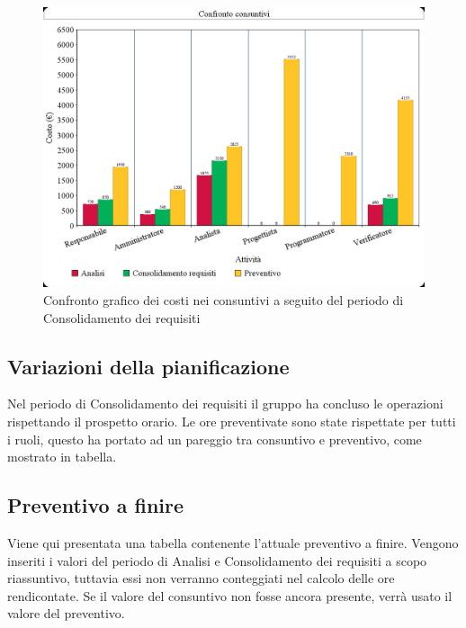 \documentclass[./PianodiProgetto.tex]{subfiles}
\begin{document}
\begin{figure}[H]
	\centering
	\includegraphics[width=1\linewidth]{img/grafici/CostiConsuntivi/consuntivo-costo-consolidamento_requisiti}
	\caption{Confronto grafico dei costi nei consuntivi a seguito del periodo di Consolidamento dei requisiti}
	\label{fig:consuntivo-costi-consolidamento_requisiti}
\end{figure}
\subsection{Variazioni della pianificazione}
Nel periodo di Consolidamento dei requisiti il gruppo ha concluso le operazioni rispettando il prospetto orario. Le ore preventivate sono state rispettate per tutti i ruoli, questo ha portato ad un pareggio tra consuntivo e preventivo, come mostrato in tabella.

\subsection{Preventivo a finire}
Viene qui presentata una tabella contenente l'attuale preventivo a finire.
Vengono inseriti i valori del periodo di Analisi e Consolidamento dei requisiti a scopo riassuntivo, tuttavia essi non verranno conteggiati nel calcolo delle ore rendicontate. Se il valore del consuntivo non fosse ancora presente, verrà usato il valore del preventivo.
\end{document}
